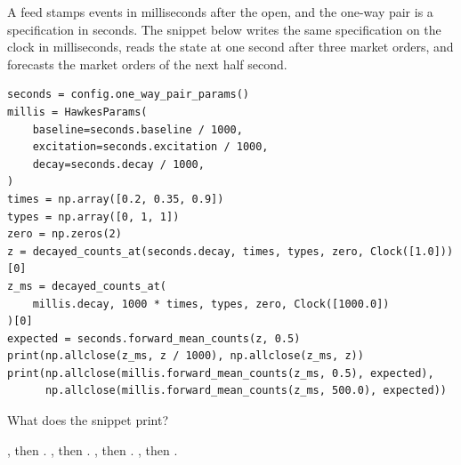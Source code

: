 \begin{question}
\label{question.millisecondClockKeepsTheState}
A feed stamps events in milliseconds after the open,
and the one-way pair is a specification in seconds.
The snippet below writes the same specification on the clock in milliseconds,
reads the state at one second after three market orders,
and forecasts the market orders of the next half second.
\begin{lstlisting}[caption={The state and the forecast on two clocks}, label=listing.millisecondClockKeepsTheState]
seconds = config.one_way_pair_params()
millis = HawkesParams(
    baseline=seconds.baseline / 1000,
    excitation=seconds.excitation / 1000,
    decay=seconds.decay / 1000,
)
times = np.array([0.2, 0.35, 0.9])
types = np.array([0, 1, 1])
zero = np.zeros(2)
z = decayed_counts_at(seconds.decay, times, types, zero, Clock([1.0]))[0]
z_ms = decayed_counts_at(
    millis.decay, 1000 * times, types, zero, Clock([1000.0])
)[0]
expected = seconds.forward_mean_counts(z, 0.5)
print(np.allclose(z_ms, z / 1000), np.allclose(z_ms, z))
print(np.allclose(millis.forward_mean_counts(z_ms, 0.5), expected),
      np.allclose(millis.forward_mean_counts(z_ms, 500.0), expected))
\end{lstlisting}
What does the snippet print?
\begin{choices}
 \correctchoice {}, then .
 \choice {}, then .
 \choice {}, then .
 \choice {}, then .
\end{choices}
\end{question}

